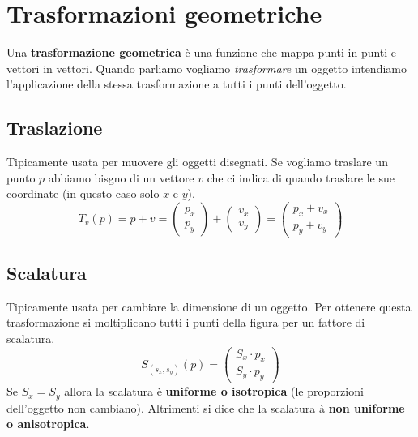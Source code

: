 \section{Trasformazioni geometriche}
Una \textbf{trasformazione geometrica} \`e una funzione che mappa punti in punti e vettori
in vettori. Quando parliamo vogliamo \emph{trasformare} un oggetto intendiamo l'applicazione
della stessa trasformazione a tutti i punti dell'oggetto.

\subsection{Traslazione}
Tipicamente usata per muovere gli oggetti disegnati. Se vogliamo traslare un punto $p$ abbiamo
bisgno di un vettore $v$ che ci indica di quando traslare le sue coordinate (in questo caso
solo $x$ e $y$).
\[
	T_v(p) = p + v =
	\begin{pmatrix}
		p_x \\ p_y
	\end{pmatrix} +
	\begin{pmatrix}
		v_x \\ v_y
	\end{pmatrix} =
	\begin{pmatrix}
		p_x + v_x \\ p_y + v_y
	\end{pmatrix}
\]

\subsection{Scalatura}
Tipicamente usata per cambiare la dimensione di un oggetto. Per ottenere questa trasformazione
si moltiplicano tutti i punti della figura per un fattore di scalatura.
\[
	S_{(s_x, s_y)}(p) =
	\begin{pmatrix}
		S_x \cdot p_x \\
		S_y \cdot p_y
	\end{pmatrix}
\]
Se $S_x = S_y$ allora la scalatura \`e \textbf{uniforme o isotropica} (le proporzioni
dell'oggetto non cambiano). Altrimenti si dice che la scalatura \`a
\textbf{non uniforme o anisotropica}.

